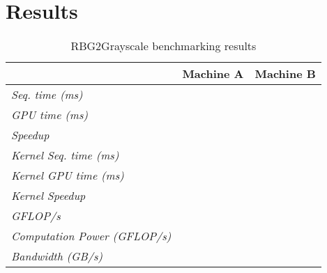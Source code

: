 \documentclass[final]{report}
\begin{document}
\section{Results}
\begin{table}[H]
	\centering
	\caption{RBG2Grayscale benchmarking results}
	\label{tab:rgb2grayscale-results}
	\begin{tabular}{lll}
	\toprule
											& \textbf{Machine A} 	& \textbf{Machine B} \\
	\midrule
	\textit{Seq. time (ms)} 				& ~ 					& ~ \\
	\textit{GPU time (ms)} 					& ~ 					& ~ \\
	\textit{Speedup} 						& ~ 					& ~ \\
	\midrule
	\textit{Kernel Seq. time (ms)} 			& ~ 					& ~ \\
	\textit{Kernel GPU time (ms)} 			& ~ 					& ~ \\
	\textit{Kernel Speedup} 				& ~ 					& ~ \\
	\midrule
	\textit{GFLOP/s} 						& ~ 					& ~ \\
	\textit{Computation Power (GFLOP/s)} 	& ~ 					& ~ \\
	\textit{Bandwidth (GB/s)}				& ~ 					& ~ \\
	\bottomrule
	\end{tabular}
\end{table}
\end{document}
